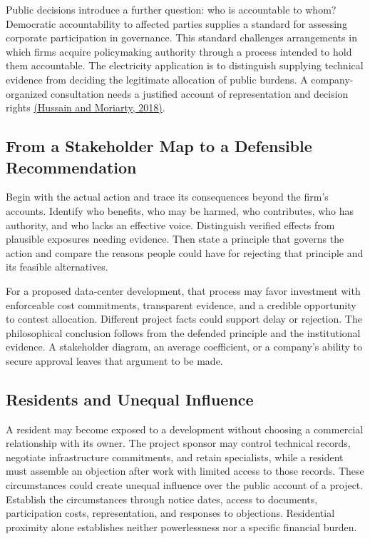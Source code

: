 Public decisions introduce a further question: who is accountable to
whom? Democratic accountability to affected parties supplies a standard
for assessing corporate participation in governance. This standard
challenges arrangements in which firms acquire policymaking authority
through a process intended to hold them accountable. The electricity
application is to distinguish supplying technical evidence from deciding
the legitimate allocation of public burdens. A company-organized
consultation needs a justified account of representation and decision
rights \href{https://doi.org/10.1007/s10551-016-3027-8}{(Hussain and
Moriarty, 2018)}.

\hypertarget{M09-from-a-stakeholder-map-to-a-defensible-recommendation}{%
\subsection{From a Stakeholder Map to a Defensible
Recommendation}\label{M09-from-a-stakeholder-map-to-a-defensible-recommendation}}

\noindent \noindent Begin with the actual action and trace its consequences beyond
the firm's accounts. Identify who benefits, who may be harmed, who
contributes, who has authority, and who lacks an effective voice.
Distinguish verified effects from plausible exposures needing evidence.
Then state a principle that governs the action and compare the reasons
people could have for rejecting that principle and its feasible
alternatives.

For a proposed data-center development, that process may favor
investment with enforceable cost commitments, transparent evidence, and
a credible opportunity to contest allocation. Different project facts
could support delay or rejection. The philosophical conclusion follows
from the defended principle and the institutional evidence. A
stakeholder diagram, an average coefficient, or a company's ability to
secure approval leaves that argument to be made.

\hypertarget{M09-residents-and-unequal-influence}{%
\subsection{Residents and Unequal
Influence}\label{M09-residents-and-unequal-influence}}

\noindent \noindent A resident may become exposed to a development without
choosing a commercial relationship with its owner. The project sponsor
may control technical records, negotiate infrastructure commitments, and
retain specialists, while a resident must assemble an objection after
work with limited access to those records. These circumstances could
create unequal influence over the public account of a project. Establish
the circumstances through notice dates, access to documents,
participation costs, representation, and responses to objections.
Residential proximity alone establishes neither powerlessness nor a
specific financial burden.

